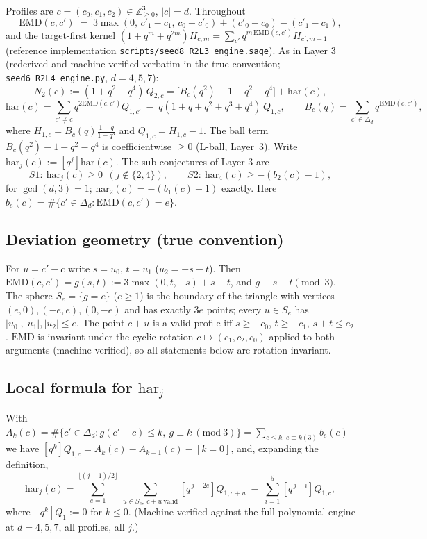 \documentclass[11pt]{article}
\theoremstyle{definition}
\theoremstyle{remark}
\newcommand{\EMD}{\mathrm{EMD}}
\newcommand{\har}{\mathrm{har}}
\newcommand{\ZZ}{\mathbb{Z}}
\begin{document}
Profiles are $c=(c_0,c_1,c_2)\in\ZZ_{\ge0}^3$, $|c|=d$. Throughout
\[
\EMD(c,c') \;=\; 3\max(0,\,c'_1-c_1,\,c_0-c'_0)+(c'_0-c_0)-(c'_1-c_1),
\]
and the target-first kernel
$(1+q^m+q^{2m})H_{c,m}=\sum_{c'}q^{m\,\EMD(c,c')}H_{c',m-1}$
(reference implementation \texttt{scripts/seed8\_R2L3\_engine.sage}).
As in Layer 3 (rederived and machine-verified verbatim in the true
convention; \texttt{seed6\_R2L4\_engine.py}, $d=4,5,7$):
\[
N_2(c):=(1+q^2+q^4)\,Q_{2,c}
=\bigl[B_c(q^2)-1-q^2-q^4\bigr]+\har(c),
\]
\[
\har(c)=\sum_{c'\ne c}q^{2\EMD(c,c')}Q_{1,c'}\;-\;q(1+q+q^2+q^3+q^4)\,Q_{1,c},
\qquad
B_c(q)=\sum_{c'\in\Delta_d}q^{\EMD(c,c')},
\]
where $H_{1,c}=B_c(q)\frac{1-q}{1-q^3}$ and $Q_{1,c}=H_{1,c}-1$.
The ball term $B_c(q^2)-1-q^2-q^4$ is coefficientwise $\ge0$ (L-ball, Layer~3).
Write $\har_j(c):=[q^j]\har(c)$. The sub-conjectures of Layer 3 are
\[
S1:\ \har_j(c)\ge 0\ \ (j\notin\{2,4\}),\qquad
S2:\ \har_4(c)\ge -(b_2(c)-1),
\]
for $\gcd(d,3)=1$; $\har_2(c)=-(b_1(c)-1)$ exactly. Here
$b_e(c)=\#\{c'\in\Delta_d:\EMD(c,c')=e\}$.

\subsection{Deviation geometry (true convention)}
For $u=c'-c$ write $s=u_0$, $t=u_1$ ($u_2=-s-t$). Then
$\EMD(c,c')=g(s,t):=3\max(0,t,-s)+s-t$, and $g\equiv s-t \pmod 3$.
The sphere $S_e=\{g=e\}$ ($e\ge1$) is the boundary of the triangle with
vertices $(e,0),(-e,e),(0,-e)$ and has exactly $3e$ points; every $u\in S_e$
has $|u_0|,|u_1|,|u_2|\le e$. The point $c+u$ is a valid profile iff
$s\ge-c_0$, $t\ge-c_1$, $s+t\le c_2$. $\EMD$ is invariant under the cyclic
rotation $c\mapsto(c_1,c_2,c_0)$ applied to both arguments
(machine-verified), so all statements below are rotation-invariant.

\subsection{Local formula for $\har_j$}
With $A_k(c)=\#\{c'\in\Delta_d: g(c'-c)\le k,\ g\equiv k\ (\mathrm{mod}\ 3)\}
=\sum_{e\le k,\,e\equiv k(3)}b_e(c)$ we have
$[q^k]Q_{1,c}=A_k(c)-A_{k-1}(c)-[k{=}0]$, and, expanding the definition,
\begin{equation}\label{eq:local}
\har_j(c)=\sum_{e=1}^{\lfloor (j-1)/2\rfloor}\ \sum_{u\in S_e,\ c+u\ \mathrm{valid}}
[q^{\,j-2e}]Q_{1,c+u}\;-\;\sum_{i=1}^{5}[q^{\,j-i}]Q_{1,c},
\end{equation}
where $[q^k]Q_1:=0$ for $k\le0$. (Machine-verified against the full
polynomial engine at $d=4,5,7$, all profiles, all $j$.)
\end{document}
